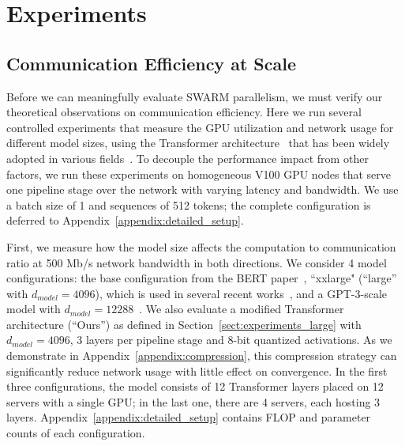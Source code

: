 \section{Experiments}

\subsection{Communication Efficiency at Scale}\label{sect:experiments_square_cube}

Before we can meaningfully evaluate SWARM parallelism, we must verify our theoretical observations on communication efficiency. Here we run several controlled experiments that measure the GPU utilization and network usage for different model sizes, using the Transformer architecture~\citep{transformer} that has been widely adopted in various fields~\citep{lin2021survey}. To decouple the performance impact from other factors, we run these experiments on homogeneous V100 GPU nodes that serve one pipeline stage over the network with varying latency and bandwidth. We use a batch size of 1 and sequences of 512 tokens; the complete configuration is deferred to Appendix~\ref{appendix:detailed_setup}.


First, we measure how the model size affects the computation to communication ratio at 500 Mb/s network bandwidth in both directions. We consider 4 model configurations: the base configuration from the BERT paper~\citep{bert}, ``xxlarge" (``large'' with $d_{model}{=}4096$),  which is used in several recent works~\citep{albert,ernie3,deberta}, and a GPT-3-scale model with $d_{model}{=}12288$~\citep{gpt3}. We also evaluate a modified Transformer architecture (``Ours'') as defined in Section~\ref{sect:experiments_large} with $d_{model}{=}4096$, 3 layers per pipeline stage and 8-bit quantized activations. As we demonstrate in Appendix~\ref{appendix:compression}, this compression strategy can significantly reduce network usage with little effect on convergence. In the first three configurations, the model consists of 12 Transformer layers placed on 12 servers with a single GPU; in the last one, there are 4 servers, each hosting 3 layers.
Appendix~\ref{appendix:detailed_setup} contains FLOP and parameter counts of each configuration.




